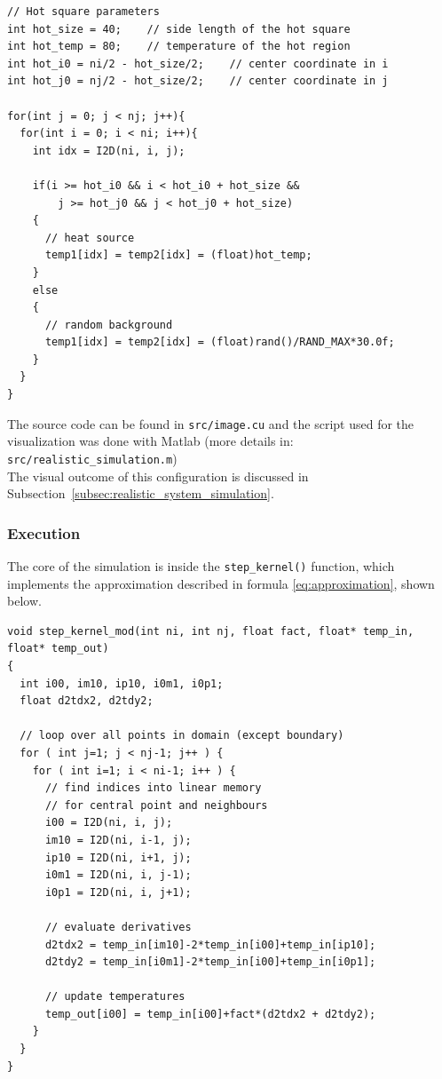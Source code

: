 \begin{lstlisting}
// Hot square parameters
int hot_size = 40;    // side length of the hot square
int hot_temp = 80;    // temperature of the hot region
int hot_i0 = ni/2 - hot_size/2;    // center coordinate in i
int hot_j0 = nj/2 - hot_size/2;    // center coordinate in j

for(int j = 0; j < nj; j++){
  for(int i = 0; i < ni; i++){
    int idx = I2D(ni, i, j);
    
    if(i >= hot_i0 && i < hot_i0 + hot_size && 
        j >= hot_j0 && j < hot_j0 + hot_size)
    {
      // heat source
      temp1[idx] = temp2[idx] = (float)hot_temp;
    }
    else
    {
      // random background
      temp1[idx] = temp2[idx] = (float)rand()/RAND_MAX*30.0f;
    }
  }
}
\end{lstlisting}

\noindent
The source code can be found in \texttt{src/image.cu} and the script used for the visualization was done with Matlab (more details in: \texttt{src/realistic\_simulation.m})\\

\noindent
The visual outcome of this configuration is discussed in Subsection~\ref{subsec:realistic_system_simulation}.


\newpage

\subsubsection*{Execution}
The core of the simulation is inside the \texttt{step\_kernel()} function, which implements the approximation described in formula \eqref{eq:approximation}, shown below.

\begin{lstlisting}
void step_kernel_mod(int ni, int nj, float fact, float* temp_in, float* temp_out)
{
  int i00, im10, ip10, i0m1, i0p1;
  float d2tdx2, d2tdy2;

  // loop over all points in domain (except boundary)
  for ( int j=1; j < nj-1; j++ ) {
    for ( int i=1; i < ni-1; i++ ) {
      // find indices into linear memory
      // for central point and neighbours
      i00 = I2D(ni, i, j);
      im10 = I2D(ni, i-1, j);
      ip10 = I2D(ni, i+1, j);
      i0m1 = I2D(ni, i, j-1);
      i0p1 = I2D(ni, i, j+1);

      // evaluate derivatives
      d2tdx2 = temp_in[im10]-2*temp_in[i00]+temp_in[ip10];
      d2tdy2 = temp_in[i0m1]-2*temp_in[i00]+temp_in[i0p1];

      // update temperatures
      temp_out[i00] = temp_in[i00]+fact*(d2tdx2 + d2tdy2);
    }
  }
}
\end{lstlisting}

